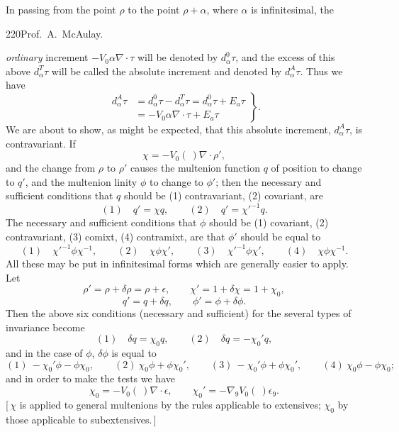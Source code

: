 \documentclass[11pt]{article}
\begin{document}
\indent In passing from the point $\rho$ to the point $\rho+\alpha$, where $\alpha$ is infinitesimal, the
\newpage\thispagestyle{empty}\begin{center}220\hfill Prof.\ A.\ McAulay.\end{center}
\emph{ordinary} increment $-V_0\alpha\nabla\cdot\tau$ will be denoted by $d_\alpha^0\tau$, and the excess of this above $d_\alpha^T\tau$ will be called the absolute increment and denoted by $d_\alpha^A\tau$. Thus we have
\begin{equation}\left.\begin{aligned}
d_\alpha^A\tau&=d_\alpha^0\tau-d_\alpha^T\tau=d_\alpha^0\tau+E_a\tau\\
&=-V_0\alpha\nabla\cdot\tau+E_a\tau
\end{aligned}\right\}.\tag{1}\end{equation}
We are about to show, as might be expected, that this absolute increment, $d_\alpha^A\tau$, is contravariant. If
\begin{equation}\chi=-V_0(\ )\nabla\cdot\rho',\tag{2}\end{equation}
and the change from $\rho$ to $\rho'$ causes the multenion function $q$ of position to change to $q'$, and the multenion linity $\phi$ to change to $\phi'$; then the necessary and sufficient conditions that $q$ should be (1) contravariant, (2) covariant, are
\[
(1)\quad q'=\chi q,\qquad (2)\quad q'=\chi'^{-1}q.
\]
The necessary and sufficient conditions that $\phi$ should be (1) covariant, (2) contravariant, (3) comixt, (4) contramixt, are that $\phi'$ should be equal to
\[
(1)\quad\chi'^{-1}\phi\chi^{-1},\qquad (2)\quad\chi\phi\chi',\qquad (3)\quad\chi'^{-1}\phi\chi',\qquad (4)\quad\chi\phi\chi^{-1}.
\]
All these may be put in infinitesimal forms which are generally easier to apply. Let
\[
\rho'=\rho+\delta\rho=\rho+\epsilon,\qquad \chi'=1+\delta\chi=1+\chi_0,
\]
\[
q'=q+\delta q,\qquad \phi'=\phi+\delta\phi.
\]
Then the above six conditions (necessary and sufficient) for the several types of invariance become
\[
(1)\quad\delta q=\chi_0q,\qquad (2)\quad\delta q=-\chi_0'q,
\]
and in the case of $\phi$, $\delta\phi$ is equal to
\[
(1)\ -\chi_0'\phi-\phi\chi_0,\qquad (2)\ \chi_0\phi+\phi\chi_0',\qquad (3)\ -\chi_0'\phi+\phi\chi_0',\qquad (4)\ \chi_0\phi-\phi\chi_0;
\]
and in order to make the tests we have
\begin{equation}\chi_0=-V_0(\ )\nabla\cdot\epsilon,\qquad \chi_0'=-\nabla_9V_0(\ )\epsilon_9.\tag{3}\end{equation}
[\,$\chi$ is applied to general multenions by the rules applicable to extensives; $\chi_0$ by those applicable to subextensives.\,]
\end{document}

